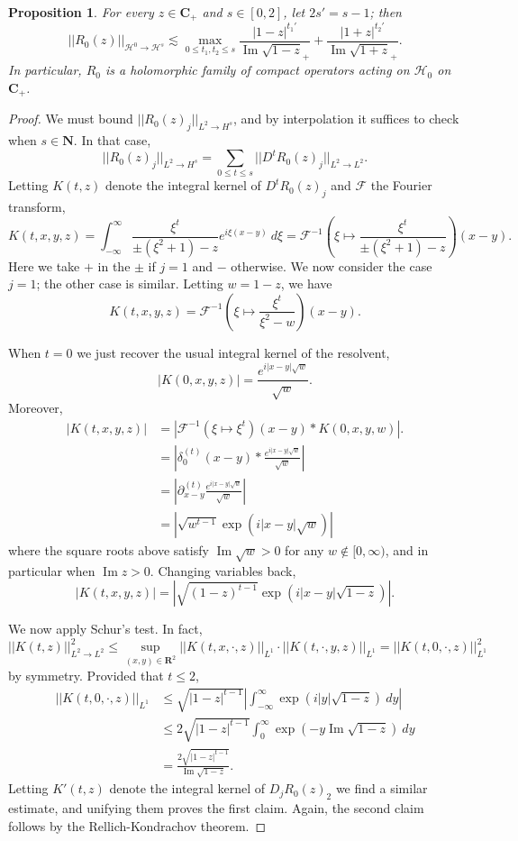 \documentclass[reqno,12pt,letterpaper]{amsart}
\newcommand{\NN}{\mathbf{N}}
\newcommand{\RR}{\mathbf{R}}
\newcommand{\CC}{\mathbf{C}}
\renewcommand{\Im}{\operatorname{Im}}
\newtheorem{proposition}[theorem]{Proposition}
\theoremstyle{definition}
\begin{document}
\begin{proposition}
\label{sharp bound on upper half free resolvent}
For every $z \in \CC_+$ and $s \in [0, 2]$, let $2s' = s - 1$; then
$$||R_0(z)||_{\mathcal H^0 \to \mathcal H^s} \lesssim \max_{0 \leq t_1,t_2 \leq s} \frac{|1-z|^{t_1'}}{\Im \sqrt{1 - z}_+} + \frac{|1+z|^{t_2'}}{\Im \sqrt{1+ z}_+}.$$
In particular, $R_0$ is a holomorphic family of compact operators acting on $\mathcal H_0$ on $\CC_+$.
\end{proposition}
\begin{proof}
We must bound $||R_0(z)_j||_{L^2 \to H^s}$, and by interpolation it suffices to check when $s \in \NN$. In that case,
$$||R_0(z)_j||_{L^2 \to H^s} = \sum_{0 \leq t \leq s} ||D^tR_0(z)_j||_{L^2 \to L^2}.$$
Letting $K(t, z)$ denote the integral kernel of $D^tR_0(z)_j$ and $\mathcal F$ the Fourier transform,
$$K(t, x, y, z) = \int_{-\infty}^\infty \frac{\xi^t}{\pm(\xi^2 + 1)-z}e^{i\xi(x-y)}~d\xi = \mathcal F^{-1}\left(\xi \mapsto \frac{\xi^t}{\pm(\xi^2 +1)-z}\right)(x-y).$$
Here we take $+$ in the $\pm$ if $j = 1$ and $-$ otherwise. We now consider the case $j = 1$; the other case is similar. Letting $w = 1 - z$, we have
$$K(t, x, y, z) = \mathcal F^{-1}\left(\xi \mapsto \frac{\xi^t}{\xi^2 - w}\right)(x-y).$$

When $t = 0$ we just recover the usual integral kernel of the resolvent,
$$|K(0, x, y, z)| = \frac{e^{i|x-y|\sqrt w}}{\sqrt w}.$$
Moreover,
\begin{align*}
  |K(t, x, y, z)| &= |\mathcal F^{-1}(\xi \mapsto \xi^t)(x-y) * K(0, x, y, w)|.\\
  &= \left|\delta^{(t)}_0(x-y) * \frac{e^{i|x-y|\sqrt w}}{\sqrt w}\right|\\
  &= \left|\partial_{x-y}^{(t)} \frac{e^{i|x-y|\sqrt w}}{\sqrt w}\right|\\
  &= \left|\sqrt{w^{t-1}} \exp(i|x-y|\sqrt w)\right|
\end{align*}
where the square roots above satisfy $\Im \sqrt w > 0$ for any $w \notin [0, \infty)$, and in particular when $\Im z > 0$. Changing variables back,
$$|K(t, x, y, z)| = \left|\sqrt{(1-z)^{t-1}} \exp(i|x-y|\sqrt{1-z})\right|.$$

We now apply Schur's test. In fact,
$$||K(t, z)||_{L^2 \to L^2}^2 \leq \sup_{(x, y) \in \RR^2} ||K(t, x, \cdot, z)||_{L^1} \cdot ||K(t, \cdot, y, z)||_{L^1} = ||K(t, 0, \cdot, z)||_{L^1}^2$$
by symmetry. Provided that $t \leq 2$,
\begin{align*}
  ||K(t, 0, \cdot, z)||_{L^1} &\leq \sqrt{|1-z|^{t-1}} \left|\int_{-\infty}^\infty \exp(i|y|\sqrt{1-z}) ~dy\right|\\
  &\leq 2\sqrt{|1-z|^{t-1}} \int_0^\infty \exp(-y\Im\sqrt{1-z})~dy\\
  &= \frac{2\sqrt{|1-z|^{t-1}}}{\Im \sqrt{1-z}}.
\end{align*}
Letting $K'(t, z)$ denote the integral kernel of $D_jR_0(z)_2$ we find a similar estimate, and unifying them proves the first claim.
Again, the second claim follows by the Rellich-Kondrachov theorem.
\end{proof}
\end{document}
